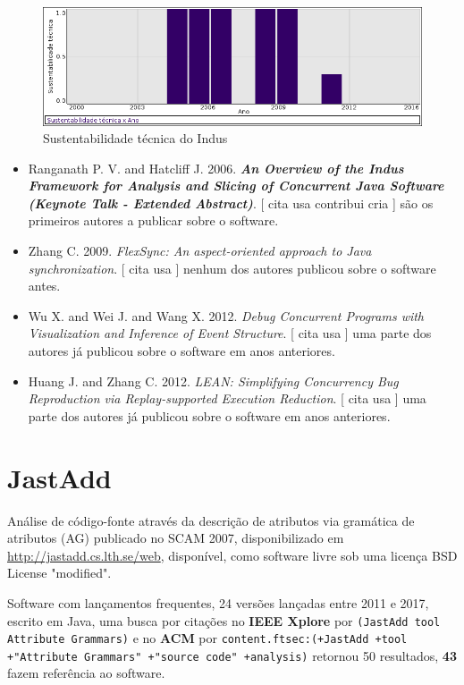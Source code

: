 \begin{figure}[h]
  \center
  \includegraphics[scale=0.50]{imagens/softwares-charts/indus.png}
  \caption{Sustentabilidade técnica do Indus}
\end{figure}


\begin{itemize}
\item Ranganath P. V. and Hatcliff J.
      2006.
        \textbf{\textit{ An Overview of the Indus Framework for Analysis and Slicing of Concurrent Java Software (Keynote Talk - Extended Abstract)}}.
      [
          cita
          usa
          contribui
          cria
      ]
são os primeiros autores a publicar sobre o software.
\item Zhang C.
      2009.
        \textit{ FlexSync: An aspect-oriented approach to Java synchronization}.
      [
          cita
          usa
      ]
nenhum dos autores publicou sobre o software antes.
\item Wu X. and Wei J. and Wang X.
      2012.
        \textit{ Debug Concurrent Programs with Visualization and Inference of Event Structure}.
      [
          cita
          usa
      ]
uma parte dos autores já publicou sobre o software em anos anteriores.
\item Huang J. and Zhang C.
      2012.
        \textit{ LEAN: Simplifying Concurrency Bug Reproduction via Replay-supported Execution Reduction}.
      [
          cita
          usa
      ]
uma parte dos autores já publicou sobre o software em anos anteriores.
\end{itemize}
\section{JastAdd}

Análise de código-fonte através da descrição de atributos via gramática de atributos (AG)
publicado no SCAM 2007,
disponibilizado em \url{http://jastadd.cs.lth.se/web},
disponível,
como software livre
sob uma licença BSD License "modified".

Software com lançamentos frequentes,
24 versões lançadas
entre 2011 e 2017,
escrito em Java,
uma busca por citações no {\bf IEEE Xplore} por
\texttt{(JastAdd tool Attribute Grammars)}
e no {\bf ACM} por
\texttt{content.ftsec:(+JastAdd +tool +"Attribute Grammars" +"source code" +analysis)}
retornou
50 resultados,
{\bf 43} fazem referência ao software.


